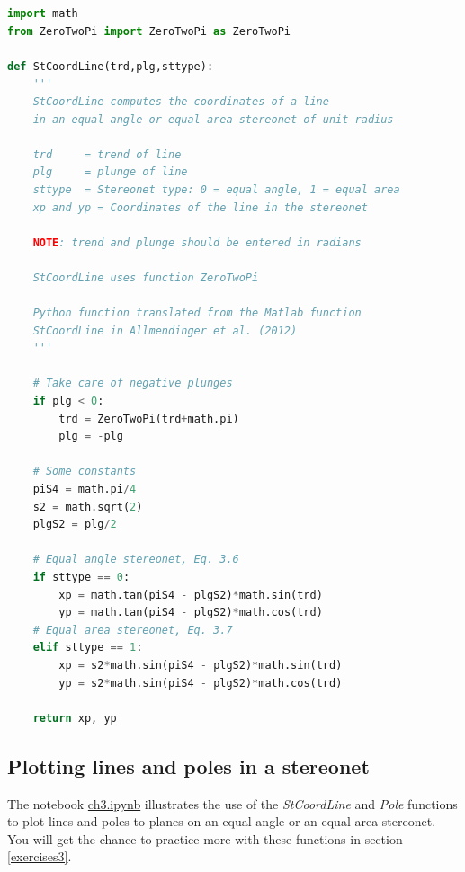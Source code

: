 \documentclass[a4paper , 12pt]{book}
\begin{document}
\begin{center}
\begin{lstlisting}[language=Python, frame=single]
import math
from ZeroTwoPi import ZeroTwoPi as ZeroTwoPi

def StCoordLine(trd,plg,sttype):
    '''
    StCoordLine computes the coordinates of a line 
    in an equal angle or equal area stereonet of unit radius
    
    trd  	= trend of line
    plg  	= plunge of line
    sttype 	= Stereonet type: 0 = equal angle, 1 = equal area
    xp and yp = Coordinates of the line in the stereonet

    NOTE: trend and plunge should be entered in radians

    StCoordLine uses function ZeroTwoPi
    
    Python function translated from the Matlab function 
    StCoordLine in Allmendinger et al. (2012)
    '''
    
    # Take care of negative plunges
    if plg < 0:
        trd = ZeroTwoPi(trd+math.pi)
        plg = -plg
        
    # Some constants
    piS4 = math.pi/4
    s2 = math.sqrt(2)
    plgS2 = plg/2
        
    # Equal angle stereonet, Eq. 3.6
    if sttype == 0:
        xp = math.tan(piS4 - plgS2)*math.sin(trd)
        yp = math.tan(piS4 - plgS2)*math.cos(trd)
    # Equal area stereonet, Eq. 3.7
    elif sttype == 1:
        xp = s2*math.sin(piS4 - plgS2)*math.sin(trd)
        yp = s2*math.sin(piS4 - plgS2)*math.cos(trd)
    
    return xp, yp
\end{lstlisting}   
\end{center}

\subsection{Plotting lines and poles in a stereonet}
The notebook \href{http://github.com}{ch3.ipynb} illustrates the use of the \textit{StCoordLine} and \textit{Pole} functions to plot lines and poles to planes on an equal angle or an equal area stereonet. You will get the chance to practice more with these functions in section \ref{exercises3}.
\end{document}
